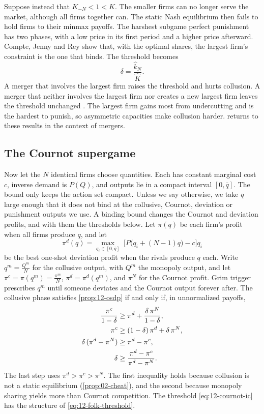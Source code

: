 Suppose instead that $K_{-N} < 1 < K$. The smaller firms can no longer serve the market, although all firms together
can. The static Nash equilibrium
then fails to hold firms to their minmax payoffs. The harshest subgame perfect punishment has two phases, with a low
price in its first period and a higher price afterward. Compte, Jenny and Rey show that, with the optimal
shares, the largest firm's constraint is the one that binds. The threshold becomes
\begin{equation}\label{eq:12-cjr-large}
\underline\delta = \frac{\hat k_N}{\hat K} .
\end{equation}
A merger that involves the largest firm raises the threshold and hurts collusion. A merger that neither involves
the largest firm nor creates a new largest firm leaves the threshold unchanged \citep[p.~240]{AskerNocke2021}. The
largest firm gains most from undercutting and is the hardest to punish, so asymmetric capacities make collusion
harder.  returns to these results in the context of mergers.

\subsection{The Cournot supergame}\label{sec:12-cournot}

Now let the $N$ identical firms choose quantities. Each has constant marginal cost $c$, inverse demand is $P(Q)$, and
outputs lie in a compact interval $[0, \bar q]$. The bound only keeps the action set compact. Unless we say otherwise,
we take $\bar q$ large enough that it does not bind at the collusive, Cournot, deviation or punishment outputs we use.
A binding bound changes the Cournot and deviation profits, and with them the thresholds below. Let $\pi(q)$ be each
firm's profit when all firms produce $q$, and let
\begin{equation}\label{eq:12-cournot-dev}
\pi^d(q) = \max_{q_i \in [0, \bar q]}\;\bigl[P\bigl(q_i + (N - 1)q\bigr) - c\bigr]q_i
\end{equation}
be the best one-shot deviation profit when the rivals produce $q$ each. Write $q^m = \frac{Q^m}{N}$ for the
collusive output, with $Q^m$ the monopoly output, and let $\pi^c = \pi(q^m) = \frac{\pi^m}{N}$, $\pi^d = \pi^d(q^m)$,
and $\pi^N$ for the Cournot profit. Grim trigger prescribes $q^m$ until someone deviates and the Cournot output
forever after. The collusive phase satisfies \cref{prop:12-osdp} if and only if, in unnormalized payoffs,
\begin{align}
\frac{\pi^c}{1 - \delta} &\ge \pi^d + \frac{\delta\,\pi^N}{1 - \delta} , \notag\\
\pi^c &\ge (1 - \delta)\,\pi^d + \delta\,\pi^N , \notag\\
\delta\,(\pi^d - \pi^N) &\ge \pi^d - \pi^c , \notag\\
\delta &\ge \frac{\pi^d - \pi^c}{\pi^d - \pi^N} . \label{eq:12-cournot-ic}
\end{align}
The last step uses $\pi^d > \pi^c > \pi^N$. The first inequality holds because collusion is not a static equilibrium
(\cref{prop:02-cheat}), and the second because monopoly sharing yields more than Cournot competition. The threshold
\eqref{eq:12-cournot-ic} has the structure of \eqref{eq:12-folk-threshold}.

